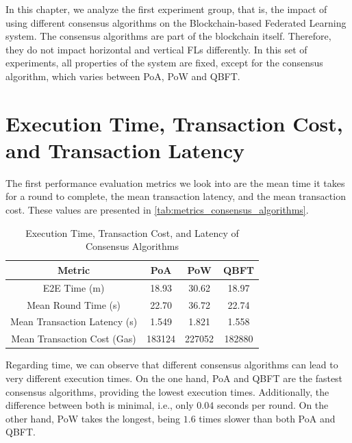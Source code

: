 In this chapter, we analyze the first experiment group, that is, the impact of using different consensus algorithms on the Blockchain-based Federated Learning system. The consensus algorithms are part of the blockchain itself. Therefore, they do not impact horizontal and vertical FLs differently. In this set of experiments, all properties of the system are fixed, except for the consensus algorithm, which varies between PoA, PoW and QBFT.

\section{Execution Time, Transaction Cost, and Transaction Latency}

The first performance evaluation metrics we look into are the mean time it takes for a round to complete, the mean transaction latency, and the mean transaction cost. These values are presented in \autoref{tab:metrics_consensus_algorithms}.

\begin{table}[!ht]
\centering
\begin{tabular}{c|c|c|c} \hline \hline
Metric                              & PoA    & PoW    & QBFT   \\ \hline \hline
E2E Time (m)            & 18.93  & 30.62  & 18.97  \\ \hline
Mean Round Time (s)             & 22.70  & 36.72  & 22.74  \\ \hline
Mean Transaction Latency (s)    & 1.549  & 1.821  & 1.558  \\ \hline
Mean Transaction Cost (Gas)     & 183124 & 227052 & 182880 \\ \hline
\end{tabular}
\caption{Execution Time, Transaction Cost, and Latency of Consensus Algorithms}
\label{tab:metrics_consensus_algorithms}
\end{table}

Regarding time, we can observe that different consensus algorithms can lead to very different execution times. On the one hand, PoA and QBFT are the fastest consensus algorithms, providing the lowest execution times. Additionally, the difference between both is minimal, i.e., only $0.04$ seconds per round. On the other hand, PoW takes the longest, being $1.6$ times slower than both PoA and QBFT.

